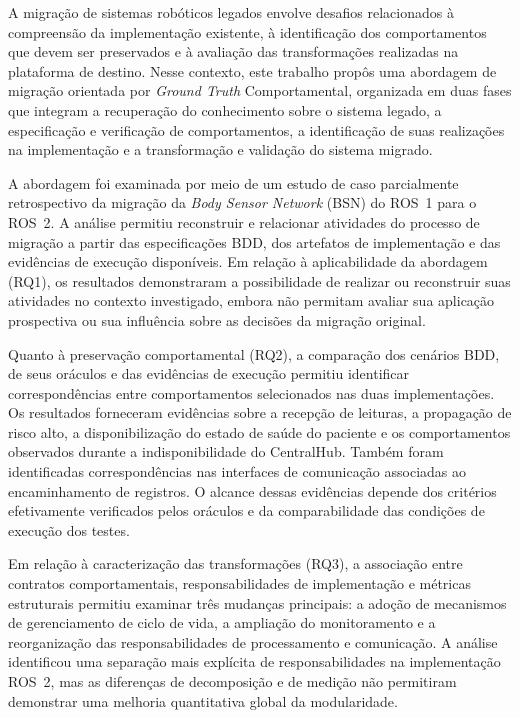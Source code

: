 \label{cap:conclusao}
A migração de sistemas robóticos legados envolve desafios relacionados à compreensão da implementação existente, à identificação dos comportamentos que devem ser preservados e à avaliação das transformações realizadas na plataforma de destino. Nesse contexto, este trabalho propôs uma abordagem de migração orientada por \textit{Ground Truth} Comportamental, organizada em duas fases que integram a recuperação do conhecimento sobre o sistema legado, a especificação e verificação de comportamentos, a identificação de suas realizações na implementação e a transformação e validação do sistema migrado.

A abordagem foi examinada por meio de um estudo de caso parcialmente retrospectivo da migração da \textit{Body Sensor Network} (BSN) do ROS~1 para o ROS~2. A análise permitiu reconstruir e relacionar atividades do processo de migração a partir das especificações BDD, dos artefatos de implementação e das evidências de execução disponíveis. Em relação à aplicabilidade da abordagem (RQ1), os resultados demonstraram a possibilidade de realizar ou reconstruir suas atividades no contexto investigado, embora não permitam avaliar sua aplicação prospectiva ou sua influência sobre as decisões da migração original.

Quanto à preservação comportamental (RQ2), a comparação dos cenários BDD, de seus oráculos e das evidências de execução permitiu identificar correspondências entre comportamentos selecionados nas duas implementações. Os resultados forneceram evidências sobre a recepção de leituras, a propagação de risco alto, a disponibilização do estado de saúde do paciente e os comportamentos observados durante a indisponibilidade do CentralHub. Também foram identificadas correspondências nas interfaces de comunicação associadas ao encaminhamento de registros. O alcance dessas evidências depende dos critérios efetivamente verificados pelos oráculos e da comparabilidade das condições de execução dos testes.

Em relação à caracterização das transformações (RQ3), a associação entre contratos comportamentais, responsabilidades de implementação e métricas estruturais permitiu examinar três mudanças principais: a adoção de mecanismos de gerenciamento de ciclo de vida, a ampliação do monitoramento e a reorganização das responsabilidades de processamento e comunicação. A análise identificou uma separação mais explícita de responsabilidades na implementação ROS~2, mas as diferenças de decomposição e de medição não permitiram demonstrar uma melhoria quantitativa global da modularidade.

